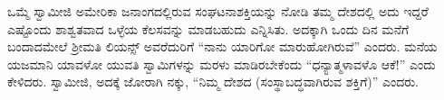 
 ಒಮ್ಮೆ ಸ್ವಾಮೀಜಿ ಅಮೇರಿಕಾ ಜನಾಂಗದಲ್ಲಿರುವ ಸಂಘಟನಾಶಕ್ತಿಯನ್ನು ನೋಡಿ ತಮ್ಮ ದೇಶದಲ್ಲಿ ಅದು ಇದ್ದರೆ ಎಷ್ಟೊಂದು ಶಾಶ್ವತವಾದ ಒಳ್ಳೆಯ ಕೆಲಸವನ್ನು ಮಾಡಬಹುದು ಎನ್ನಿಸಿತು. ಅದಕ್ಕಾಗಿ ಒಂದು ದಿನ ಮನೆಗೆ ಬಂದಾದಮೇಲೆ ಶ‍್ರೀಮತಿ ಲಿಯನ್ಸ್ ಅವರೆದುರಿಗೆ “ನಾನು ಯಾರಿಗೋ ಮಾರುಹೋಗಿರುವೆ” ಎಂದರು. ಮನೆಯ ಯಜಮಾನಿ ಯಾವಳೋ ಯುವತಿ ಸ್ವಾಮಿಗಳನ್ನು ಮರಳು ಮಾಡಿರಬೇಕೆಂದು “ಧನ್ಯಾತ್ಮಳಾವಳೊ ಆಕೆ!” ಎಂದು ಕೇಳಿದರು. ಸ್ವಾಮೀಜಿ, ಅದಕ್ಕೆ ಜೋರಾಗಿ ನಕ್ಕು, “ನಿಮ್ಮ ದೇಶದ  (ಸಂಸ್ಥಾಬದ್ಧವಾಗಿರುವ ಶಕ್ತಿಗೆ)” ಎಂದರು. 

